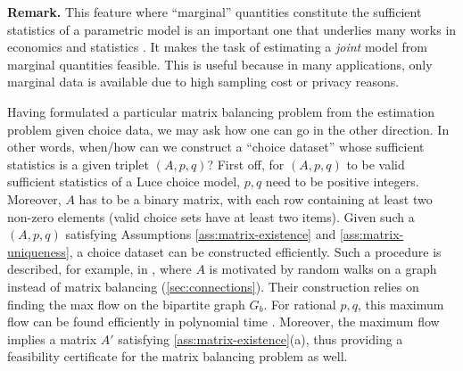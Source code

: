 \textbf{Remark.} This feature where ``marginal'' quantities constitute the sufficient statistics of a parametric model is an important one that underlies many works in economics and statistics \citep{kullback1997information,stone1962multiple,good1963maximum,birch1963maximum,theil1967economics,fienberg1970iterative,berry1995automobile,fofana2002balancing,maystre2017choicerank}. It makes the task of estimating a \emph{joint} model from marginal quantities feasible. This is useful because in many applications, only marginal data is available due to high sampling cost or privacy reasons. %

Having formulated a particular matrix balancing problem from the estimation problem given choice data, we may ask how one can go in the other direction. In other words, when/how can we construct a ``choice dataset'' whose sufficient statistics is a given triplet $(A,p,q)$? First off, for $(A,p,q)$ to be valid sufficient statistics of a Luce choice model, $p,q$ need to be positive integers. Moreover, $A$ has to be a binary matrix, with each row containing at least two non-zero elements (valid choice sets have at least two items). Given such a $(A,p,q)$ satisfying Assumptions \ref{ass:matrix-existence} and \ref{ass:matrix-uniqueness}, a choice dataset can be constructed efficiently. Such a procedure is described, for example, in \citet{kumar2015inverting}, where $A$ is motivated
by random walks on a graph instead of matrix balancing (\cref{sec:connections}). Their construction relies on finding the max flow on the bipartite graph $G_b$. For rational $p,q$, this maximum flow can be found efficiently in polynomial time \citep{balakrishnan2004polynomial,idel2016review}. Moreover, the maximum flow implies a matrix $A'$ satisfying \cref{ass:matrix-existence}(a), thus providing a feasibility certificate for the matrix balancing problem as well. 


